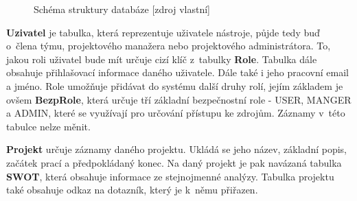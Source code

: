     \begin{figure}[!htbp]
    \begin{center}
    \caption{Schéma struktury databáze [zdroj vlastní]}
    \label{schemaDB}
    \end{center}
    \end{figure}


\textbf{Uzivatel} je tabulka, která reprezentuje uživatele nástroje, půjde tedy buď o~člena týmu, projektového manažera nebo projektového administrátora. To, jakou roli uživatel bude mít určuje cizí klíč z~tabulky \textbf{Role}. Tabulka dále obsahuje přihlašovací informace daného uživatele. Dále také i jeho pracovní email a jméno. Role umožňuje přidávat do systému další druhy rolí, jejím základem je ovšem \textbf{BezpRole}, která určuje tří základní bezpečnostní role - USER, MANGER a ADMIN, které se využívají pro určování přístupu ke zdrojům. Záznamy v~této tabulce nelze měnit.


\textbf{Projekt} určuje záznamy daného projektu. Ukládá se jeho název, základní popis, začátek prací a předpokládaný konec. Na daný projekt je pak navázaná tabulka \textbf{SWOT}, která obsahuje informace ze stejnojmenné analýzy. Tabulka projektu také obsahuje odkaz na dotazník, který je k~němu přiřazen. 


